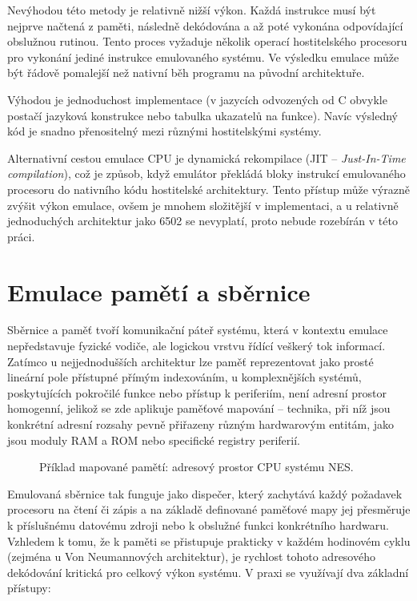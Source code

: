 Nevýhodou této metody je relativně nižší výkon. Každá instrukce musí být nejprve načtená z paměti,
následně dekódována a až poté vykonána odpovídající obslužnou rutinou. Tento proces vyžaduje několik
operací hostitelského procesoru pro vykonání jediné instrukce emulovaného systému. Ve výsledku
emulace může být řádově pomalejší než nativní běh programu na původní architektuře.

Výhodou je jednoduchost implementace (v jazycích odvozených od C obvykle postačí jazyková konstrukce
 nebo tabulka ukazatelů na funkce). Navíc výsledný kód je snadno přenositelný mezi
různými hostitelskými systémy.

Alternativní cestou emulace CPU je dynamická rekompilace (JIT -- \textit{Just-In-Time compilation}),
což je způsob, když emulátor překládá bloky instrukcí emulovaného procesoru do nativního kódu
hostitelské architektury. Tento přístup může výrazně zvýšit výkon emulace, ovšem je mnohem
složitější v implementaci, a u relativně jednoduchých architektur jako 6502 se nevyplatí, proto
nebude rozebírán v této práci.

\section{Emulace pamětí a sběrnice}

Sběrnice a paměť tvoří komunikační páteř systému, která v kontextu emulace nepředstavuje fyzické
vodiče, ale logickou vrstvu řídící veškerý tok informací. Zatímco u nejjednodušších architektur lze
paměť reprezentovat jako prosté lineární pole přístupné přímým indexováním, u komplexnějších
systémů, poskytujících pokročilé funkce nebo přístup k periferiím, není adresní prostor homogenní,
jelikož se zde aplikuje paměťové mapování – technika, při níž jsou konkrétní adresní rozsahy pevně
přiřazeny různým hardwarovým entitám, jako jsou moduly RAM a ROM nebo specifické registry periferií.

\begin{figure}[H]
    \centering
    
    \caption{Příklad mapované pamětí: adresový prostor CPU systému NES.}
    \label{fig:memory_map}
\end{figure}

Emulovaná sběrnice tak funguje jako dispečer, který zachytává každý požadavek procesoru na
čtení či zápis a na základě definované paměťové mapy jej přesměruje k příslušnému datovému zdroji
nebo k obslužné funkci konkrétního hardwaru. Vzhledem k tomu, že k paměti se přistupuje prakticky v
každém hodinovém cyklu (zejména u Von Neumannových architektur), je rychlost tohoto adresového
dekódování kritická pro celkový výkon systému. V praxi se využívají dva základní přístupy:

